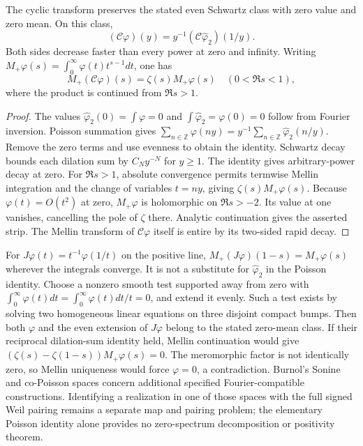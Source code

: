 \begin{theorem}
\label{v4-arith:w7-i:thm:burnol-copoisson}
The cyclic transform preserves the stated even Schwartz class with
zero value and zero mean. On this class,
\begin{equation}
\label{v4-arith:w7-i:eq:copoisson-fe}
 (\mathcal C\varphi)(y)=y^{-1}
              (\mathcal C\widehat\varphi_2)(1/y).
\end{equation}
Both sides decrease faster than every power at zero and infinity.
Writing $M_+\varphi(s)=\int_0^\infty\varphi(t)t^{s-1}dt$, one has
\[
 M_+(\mathcal C\varphi)(s)=\zeta(s)M_+\varphi(s)
 \quad(0<\Re s<1),
\]
where the product is continued from $\Re s>1$.
\end{theorem}
\begin{proof}
The values $\widehat\varphi_2(0)=\int\varphi=0$ and
$\int\widehat\varphi_2=\varphi(0)=0$ follow from Fourier inversion.
Poisson summation gives
$\sum_{n\in\mathbb Z}\varphi(ny)
=y^{-1}\sum_{n\in\mathbb Z}\widehat\varphi_2(n/y)$.
Remove the zero terms and use evenness to obtain the identity.
Schwartz decay bounds each dilation sum by $C_N y^{-N}$ for
$y\ge1$. The identity gives arbitrary-power decay at zero.
For $\Re s>1$, absolute convergence permits termwise Mellin
integration and the change of variables $t=ny$, giving
$\zeta(s)M_+\varphi(s)$.
Because $\varphi(t)=O(t^2)$ at zero, $M_+\varphi$ is holomorphic
on $\Re s>-2$. Its value at one vanishes, cancelling the pole
of $\zeta$ there. Analytic continuation gives the asserted strip.
The Mellin transform of $\mathcal C\varphi$ itself is entire by
its two-sided rapid decay.
\end{proof}

\begin{remark}
For $J\varphi(t)=t^{-1}\varphi(1/t)$ on the positive line,
$M_+(J\varphi)(1-s)=M_+\varphi(s)$ wherever the integrals converge.
It is not a substitute for $\widehat\varphi_2$ in the Poisson identity.
Choose a nonzero smooth test supported away from zero with
$\int_0^\infty\varphi(t)dt=\int_0^\infty\varphi(t)dt/t=0$,
and extend it evenly. Such a test exists by solving two homogeneous
linear equations on three disjoint compact bumps. Then both
$\varphi$ and the even extension of $J\varphi$ belong to the
stated zero-mean class. If their reciprocal dilation-sum identity held, Mellin
continuation would give
$(\zeta(s)-\zeta(1-s))M_+\varphi(s)=0$.
The meromorphic factor is not identically zero, so Mellin uniqueness
would force $\varphi=0$, a contradiction.
Burnol's Sonine and co-Poisson spaces concern additional specified
Fourier-compatible constructions. Identifying a realization in one
of those spaces with the full signed Weil pairing remains a separate
map and pairing problem; the elementary Poisson identity alone
provides no zero-spectrum decomposition or positivity theorem.
\end{remark}

